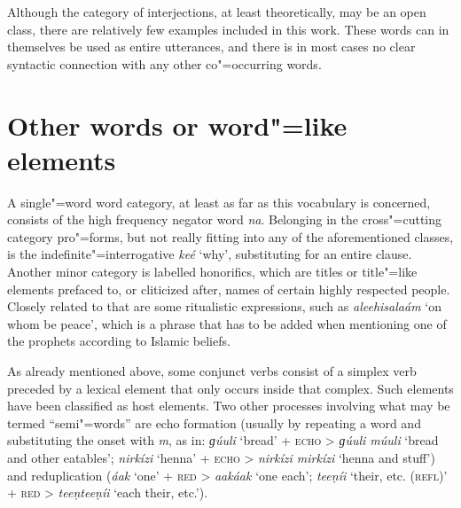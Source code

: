 Although the category of interjections, at least theoretically, may be an open class, there are relatively few examples included in this work. These words can in themselves be used as entire utterances, and there is in most cases no clear syntactic connection with any other co"=occurring words.


\section{Other words or word"=like elements}
\label{sec:3b-15}
A single"=word word category, at least as far as this vocabulary is concerned, consists of the high frequency negator word \textit{na}. Belonging in the cross"=cutting category pro"=forms, but not really fitting into any of the aforementioned classes, is the indefinite"=interrogative \textit{keé} `why', substituting for an entire clause. Another minor category is labelled honorifics, which are titles or title"=like elements prefaced to, or cliticized after, names of certain highly respected people. Closely related to that are some ritualistic expressions, such as \textit{aleehisalaám} `on whom be peace', which is a phrase that has to be added when mentioning one of the prophets according to Islamic beliefs.


As already mentioned above, some conjunct verbs consist of a simplex verb preceded by a lexical element that only occurs inside that complex. Such elements have been classified as host elements. Two other processes involving what may be termed ``semi"=words'' are echo formation (usually by repeating a word and substituting the onset with \textit{m}, as in: \textit{ɡúuli} `bread' + \textsc{echo} > \textit{ɡúuli múuli} `bread and other eatables'; \textit{nirkízi} `henna' + \textsc{echo} > \textit{nirkízi mirkízi} `henna and stuff') and reduplication (\textit{áak} `one' + \textsc{red} > \textit{aakáak} `one each'; \textit{teeṇíi} `their, etc. (\textsc{refl})' + \textsc{red} > \textit{teeṇteeṇíi} `each their, etc.').

